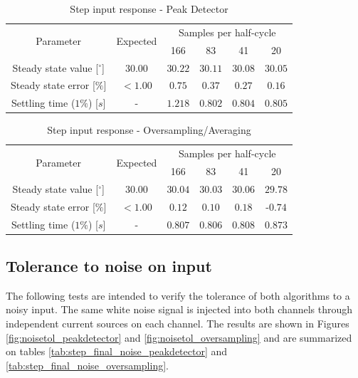 \documentclass[conference]{IEEEtran}
\begin{document}
\begin{table}[h!]
\centering
\caption{Step input response - Peak Detector}
\label{tab:step_final_peakdetector}
\begin{tabular}{|c|c|c|c|c|c|}
\hline
\multirow{2}{*}{Parameter} & \multirow{2}{*}{Expected}    & \multicolumn{4}{c|}{Samples per half-cycle} \\ \cline{3-6} 
                           &                                 & 166  & 83  & 41  & 20  \\ \hline
Steady state value [$^{\circ}$]        & $30.00$	& $30.22$  & $30.11$ & $30.08$  & $30.05$   \\ \hline
Steady state error [$\%$]        & $<1.00$  		& $0.75$	   & $0.37$       & $0.27$     & $0.16$     \\ \hline
Settling time ($1\%$) [$s$]		& - 		& 	$1.218$		& $0.802$		& $0.804$ 	& $0.805$			\\ \hline
\end{tabular}
\end{table}

\begin{table}[h!]
\centering
\caption{Step input response - Oversampling/Averaging}
\label{tab:step_final_oversampling}
\begin{tabular}{|c|c|c|c|c|c|}
\hline
\multirow{2}{*}{Parameter} & \multirow{2}{*}{Expected}    & \multicolumn{4}{c|}{Samples per half-cycle} \\ \cline{3-6} 
                           &                                 & 166  & 83  & 41  & 20  \\ \hline
Steady state value [$^{\circ}$]         & $30.00$	 & $30.04$ & $30.03$ & $30.06$     & $29.78$    \\ \hline
Steady state error [$\%$]         & $<1.00$  		& $0.12$    & $0.10$       & $0.18$     &  -$0.74$    \\ \hline
Settling time ($1\%$) [$s$]		& - 		& $0.807$		& $0.806$ 		& $0.808$ 	& $0.873$			\\ \hline
\end{tabular}
\end{table}


\subsection{Tolerance to noise on input}

The following tests are intended to verify the tolerance of both algorithms to a noisy input. The same white noise signal is injected into both channels through independent current sources on each channel. The results are shown in Figures \ref{fig:noisetol_peakdetector} and \ref{fig:noisetol_oversampling} and are summarized on tables \ref{tab:step_final_noise_peakdetector} and \ref{tab:step_final_noise_oversampling}.
\end{document}
